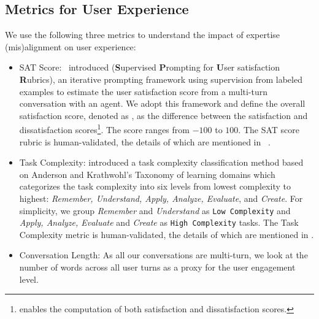 \subsection{Metrics for User Experience}\label{user_exp_metrics}
We use the following three metrics to understand the impact of expertise (mis)alignment on user experience:
\begin{itemize}[nosep]
    \item SAT Score:~\citet{lin-etal-2024-interpretable} introduced  (\textbf{S}upervised \textbf{P}rompting for \textbf{U}ser satisfaction \textbf{R}ubrics), an iterative prompting framework using supervision from labeled examples to estimate the user satisfaction score from a multi-turn conversation with an  agent. We adopt this framework and define the overall satisfaction score, denoted as , as the difference between the satisfaction and dissatisfaction scores\footnote{ enables the computation of both satisfaction and dissatisfaction scores.}. The  score ranges from $-100$ to $100$. The SAT score rubric is human-validated, the details of which are mentioned in ~\citet{lin-etal-2024-interpretable}.
    \item Task Complexity: \citet{suri2024usegenerativesearchengines} introduced a task complexity classification method based on Anderson and Krathwohl’s Taxonomy of learning domains \cite{armstrong2010bloom} which categorizes the task complexity into six levels from lowest complexity to highest: \textit{Remember, Understand, Apply, Analyze, Evaluate}, and \textit{Create}. For simplicity, we group \textit{Remember} and  \textit{Understand} as \texttt{Low Complexity} and \textit{Apply, Analyze, Evaluate} and \textit{Create} as \texttt{High Complexity} tasks. The Task Complexity metric is human-validated, the details of which are mentioned in \citet{suri2024usegenerativesearchengines}. 
    \item Conversation Length: As all our conversations are multi-turn, we look at the number of words across all user turns as a proxy for the user engagement level.
\end{itemize}

